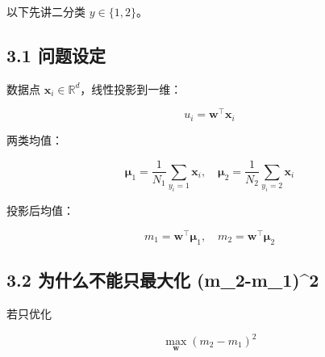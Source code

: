 以下先讲二分类 \(y\in\{1,2\}\)。

\subsection{3.1 问题设定}\label{ux95eeux9898ux8bbeux5b9a}

数据点 \(\mathbf{x}_i\in\mathbb{R}^d\)，线性投影到一维：

\[
u_i=\mathbf{w}^\top \mathbf{x}_i
\]

两类均值：

\[
\boldsymbol{\mu}_1=\frac{1}{N_1}\sum_{y_i=1}\mathbf{x}_i,\quad
\boldsymbol{\mu}_2=\frac{1}{N_2}\sum_{y_i=2}\mathbf{x}_i
\]

投影后均值：

\[
m_1=\mathbf{w}^\top\boldsymbol{\mu}_1,\quad
m_2=\mathbf{w}^\top\boldsymbol{\mu}_2
\]

\subsection{3.2 为什么不能只最大化
(m\_2-m\_1)\^{}2}\label{ux4e3aux4ec0ux4e48ux4e0dux80fdux53eaux6700ux5927ux5316-m_2-m_12}

若只优化

\[
\max_{\mathbf{w}} (m_2-m_1)^2
\]

